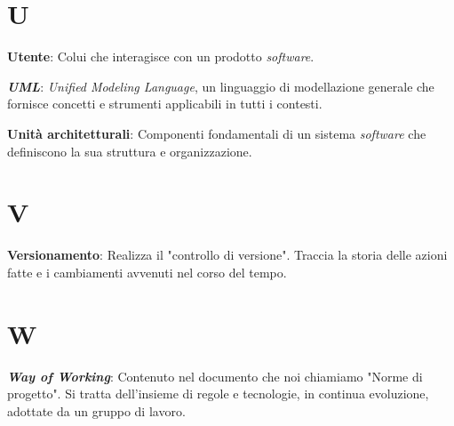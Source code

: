 \documentclass[5pt]{article}
\begin{document}
\section*{U}
\begin{flushleft}

\textbf{Utente}: Colui che interagisce con un prodotto \textit{software}.\newline

\textbf{\textit{UML}}: \textit{Unified Modeling Language}, un linguaggio di modellazione generale che fornisce concetti e strumenti applicabili in tutti i contesti.\newline

\textbf{Unità architetturali}: Componenti fondamentali di un sistema \textit{software} che definiscono la sua struttura e organizzazione.\newline


\end{flushleft}

\pagebreak

\section*{V}
\begin{flushleft}
	
\textbf{Versionamento}: Realizza il "controllo di versione". Traccia la storia delle azioni fatte e i cambiamenti avvenuti nel corso del tempo.\newline
	
\end{flushleft}

\pagebreak

\section*{W}
\begin{flushleft}

\textbf{\textit{Way of Working}}: Contenuto nel documento che noi chiamiamo "Norme di progetto". Si tratta dell'insieme di regole e tecnologie, in continua evoluzione, adottate da un gruppo di lavoro.\newline

\end{flushleft}
\end{document}
